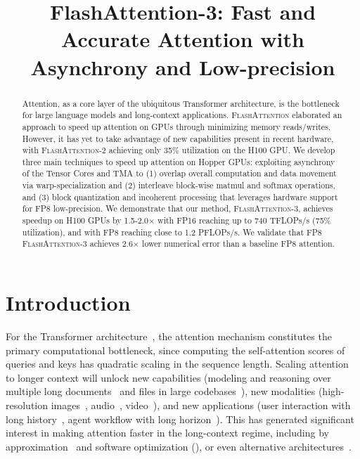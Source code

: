 \title{FlashAttention-3: Fast and Accurate Attention with Asynchrony and Low-precision}

\begin{abstract}
Attention, as a core layer of the ubiquitous Transformer architecture, is the bottleneck for large language models and long-context applications.
\textsc{FlashAttention} elaborated an approach to speed up attention on GPUs through minimizing memory reads/writes. However, it has yet to take advantage of new capabilities present in recent hardware, with \textsc{FlashAttention-2} achieving only 35\% utilization on the H100 GPU. We develop three main techniques to speed up attention on Hopper GPUs: exploiting asynchrony of the Tensor Cores and TMA to (1) overlap overall computation and data movement via warp-specialization and (2) interleave block-wise matmul and softmax operations, and (3) block quantization and incoherent processing that leverages hardware support for FP8 low-precision. We demonstrate that our method, \textsc{FlashAttention-3}, achieves speedup on H100 GPUs by 1.5-2.0$\times$ with FP16 reaching up to 740 TFLOPs/s (75\% utilization), and with FP8 reaching close to 1.2 PFLOPs/s. We validate that FP8 \textsc{FlashAttention-3} achieves 2.6$\times$ lower numerical error than a baseline FP8 attention.
\end{abstract}

\section{Introduction}
\label{sec:intro}

For the Transformer architecture~\citep{vaswani2017attention}, the attention mechanism constitutes the primary computational bottleneck, since computing the self-attention scores of queries and keys has quadratic scaling in the sequence length. Scaling attention to longer context will unlock new capabilities (modeling and reasoning over multiple long documents~\citep{guo2021longt5,shaham2022scrolls,peng2023yarn} and files in large codebases~\citep{roziere2023code, li2023starcoder}), new modalities (high-resolution images~\citep{chen2022scaling}, audio~\citep{gulati2020conformer}, video~\citep{ho2022video}), and new applications (user interaction with long history~\citep{sun2019bert4rec}, agent workflow with long horizon~\citep{yao2022react}). This has generated significant interest in making attention faster in the long-context regime, including by approximation~\citep{katharopoulos2020transformers,choromanski2020rethinking,
tay2020efficient} and software optimization (\citep{rabe2021self,dao2022flashattention,kwon2023efficient}), or even alternative architectures~\citep{peng2023rwkv,sun2023retentive,gu2023mamba}.


